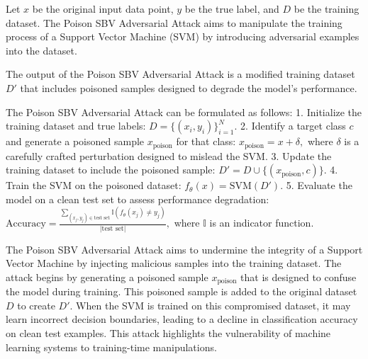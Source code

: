 Let \( x \) be the original input data point, \( y \) be the true label, and \( D \) be the training dataset. The Poison SBV Adversarial Attack aims to manipulate the training process of a Support Vector Machine (SVM) by introducing adversarial examples into the dataset.

The output of the Poison SBV Adversarial Attack is a modified training dataset \( D' \) that includes poisoned samples designed to degrade the model's performance.

The Poison SBV Adversarial Attack can be formulated as follows:
1. Initialize the training dataset and true labels:
   $
   D = \{(x_i, y_i)\}_{i=1}^N.
   $
2. Identify a target class \( c \) and generate a poisoned sample \( x_{\text{poison}} \) for that class:
   $
   x_{\text{poison}} = x + \delta,
   $
   where \( \delta \) is a carefully crafted perturbation designed to mislead the SVM.
3. Update the training dataset to include the poisoned sample:
   $
   D' = D \cup \{(x_{\text{poison}}, c)\}.
   $
4. Train the SVM on the poisoned dataset:
   $
   f_{\theta}(x) = \text{SVM}(D').
   $
5. Evaluate the model on a clean test set to assess performance degradation:
   $
   \text{Accuracy} = \frac{\sum_{(x_j, y_j) \in \text{test set}} \mathbb{I}(f_{\theta}(x_j) \neq y_j)}{|\text{test set}|},
   $
   where \( \mathbb{I} \) is an indicator function.

The Poison SBV Adversarial Attack aims to undermine the integrity of a Support Vector Machine by injecting malicious samples into the training dataset. The attack begins by generating a poisoned sample \( x_{\text{poison}} \) that is designed to confuse the model during training. This poisoned sample is added to the original dataset \( D \) to create \( D' \). When the SVM is trained on this compromised dataset, it may learn incorrect decision boundaries, leading to a decline in classification accuracy on clean test examples. This attack highlights the vulnerability of machine learning systems to training-time manipulations.
